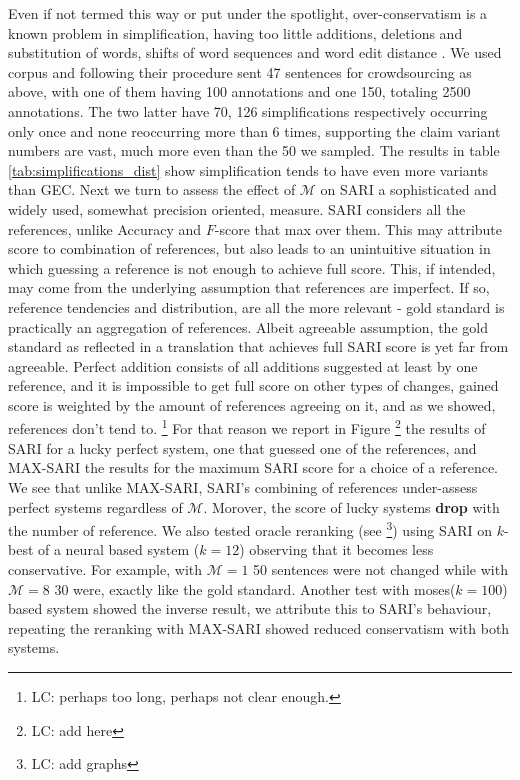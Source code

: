 \documentclass[letterpaper, 11pt]{article}
\newcommand{\lc}[1]{\footnote{\color{blue}LC: #1}}
\begin{document}
Even if not termed this way or put under the spotlight, over-conservatism is a known problem in simplification, having too little additions, deletions and substitution of words, shifts of word sequences \cite{zhang2017sentence} and word edit distance \cite{narayan2015unsupervised}. 
We used  corpus and following their procedure sent 47 sentences for crowdsourcing as above, with one of them having 100 annotations and one 150, totaling 2500 annotations. The two latter have 70, 126 simplifications respectively occurring only once and none reoccurring more than 6 times, supporting the claim variant numbers are vast, much more even than the 50 we sampled.
The results in table \ref{tab:simplifications_dist} show simplification tends to have even more variants than GEC. 
Next we turn to assess the effect of $\mathcal{M}$ on SARI \cite{Xu-EtAl:2016:TACL} a sophisticated and widely used, somewhat precision oriented, measure. SARI considers all the references, unlike Accuracy and $F$-score that max over them. This may attribute score to combination of references, but also leads to an unintuitive situation in which guessing a reference is not enough to achieve full score. This, if intended, may come from the underlying assumption that references are imperfect. If so, reference tendencies and distribution, are all the more relevant - gold standard is practically an aggregation of references. Albeit agreeable assumption, the gold standard as reflected in a translation that achieves full SARI score is yet far from agreeable. Perfect addition consists of all additions suggested at least by one reference, and it is impossible to get full score on other types of changes, gained score is weighted by the amount of references agreeing on it, and as we showed, references don't tend to. \lc{perhaps too long, perhaps not clear enough.} For that reason we report in Figure \lc{add here} the results of SARI for a lucky perfect system, one that guessed one of the references, and MAX-SARI the results for the maximum SARI score for a choice of  a reference. We see that unlike MAX-SARI, SARI's combining of references under-assess perfect systems regardless of $\mathcal{M}$. Morover, the score of lucky systems  \textbf{drop} with the number of reference. 
We also tested oracle reranking (see \lc{add graphs}) using SARI on $k$-best of a neural based system ($k=12$) observing that it becomes less conservative. For example, with $\mathcal{M}=1$ 50 sentences were not changed while with $\mathcal{M}=8$ 30 were, exactly like the gold standard. Another test with moses($k=100$) based system showed the inverse result, we attribute this to SARI's behaviour, repeating the reranking with MAX-SARI showed reduced conservatism with both systems.
\end{document}
